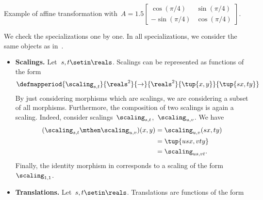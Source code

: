\begin{solution}
    \begin{marginfigure}
        \begin{center}
        \end{center}
        \caption{Example of affine transformation with~$A=1.5\begin{bmatrix}
                    \cos(\pi/4) & \sin(\pi/4) \\-\sin(\pi/4)& \cos(\pi/4)
                \end{bmatrix}$.}
    \end{marginfigure}
    We check the specializations one by one.
    In all specializations, we consider the same objects as in~\Draw.
    \begin{itemize}
        \item \textbf{Scalings.}
              Let~$s,t\setin \reals$.
              Scalings can be represented as functions of the form
              \begin{equation}
                  \defmapperiod{
                      \scaling_{s,t}
                  }{
                      \reals^2
                  }{
                      \to
                  }{
                      \reals^2
                  }{
                      \tup{x,y}
                  }{
                      \tup{s x,t y}
                  }
              \end{equation}
              By just considering morphisms which are scalings, we are considering a subset of all morphisms.
              Furthermore, the composition of two scalings is again a scaling.
              Indeed, consider scalings~$\scaling_{s,t}$,~$\scaling_{u,v}$.
              We have
              \begin{equation}
                  \begin{aligned}
                      (\scaling_{s,t}\mthen \scaling_{u,v})(x,y)
                       & =\scaling_{u,v}(sx, ty) \\
                       & =\tup{usx, vty} \\
                       & =\scaling_{us,vt}.
                  \end{aligned}
              \end{equation}
              Finally, the identity morphism in \Draw corresponds to a scaling of the form $\scaling_{1,1}$.
        \item \textbf{Translations.}
              Let~$s,t\setin \reals$.
              Translations are functions of the form
              \begin{equation}

\end{equation}
\end{itemize}
\end{solution}
